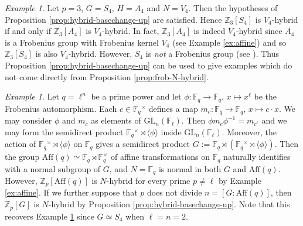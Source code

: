 \documentclass[12pt]{amsart}
\theoremstyle{plain}
\theoremstyle{remark}
\newtheorem{example}[theorem]{Example}
\theoremstyle{definition}
\numberwithin{equation}{section}
\begin{document}
\begin{example}\label{ex:S4-A4-V4}
Let $p=3$, $G=S_{4}$, $H=A_{4}$ and $N = V_{4}$. Then the hypotheses of Proposition \ref{prop:hybrid-basechange-up} are satisfied.
Hence ${\mathbb{Z}}_{3}[S_{4}]$ is $V_{4}$-hybrid if and only if ${\mathbb{Z}}_{3}[A_{4}]$ is $V_{4}$-hybrid.
In fact, ${\mathbb{Z}}_{3}[A_{4}]$ is indeed $V_{4}$-hybrid since $A_{4}$ is a Frobenius group with Frobenius kernel $V_{4}$
(see Example \ref{ex:affine}) and so ${\mathbb{Z}}_{3}[S_{4}]$ is also $V_{4}$-hybrid.
However, $S_{4}$ is \emph{not} a Frobenius group (see \cite[Example 2.18]{hybrid-ETNC}).
Thus Proposition \ref{prop:hybrid-basechange-up} can be used to give examples which do not come directly from
Proposition \ref{prop:frob-N-hybrid}.
\end{example}

\begin{example} \label{ex:affine-Frobenius}
Let $q = \ell^{n}$ be a prime power and let $\phi: {\mathbb{F}}_{q} \rightarrow {\mathbb{F}}_{q}$, $x \mapsto x^{\ell}$ be the Frobenius automorphism.
Each $c \in {\mathbb{F}}_{q}{^{\times}}$ defines a map $m_{c}: {\mathbb{F}}_{q} \rightarrow {\mathbb{F}}_{q}$, $x \mapsto c \cdot x$.
We may consider $\phi$ and $m_{c}$ as elements of ${\mathrm{GL}}_{n}({\mathbb{F}}_{\ell})$. Then $\phi m_{c} \phi^{-1} = m_{c^{\ell}}$
and we may form the semidirect product ${\mathbb{F}}_{q}{^{\times}} \rtimes \langle \phi \rangle$ inside ${\mathrm{GL}}_{n}({\mathbb{F}}_{\ell})$.
Moreover, the action of ${\mathbb{F}}_{q}{^{\times}} \rtimes \langle \phi \rangle$ on ${\mathbb{F}}_{q}$ gives a semidirect product
$G := {\mathbb{F}}_{q} \rtimes ({\mathbb{F}}_{q}{^{\times}} \rtimes \langle \phi \rangle)$.
Then the group ${\mathrm{Aff}}(q) \simeq {\mathbb{F}}_{q} \rtimes {\mathbb{F}}_{q}^{\times}$ of affine transformations on ${\mathbb{F}}_{q}$
naturally identifies with a normal subgroup of $G$, and $N = {\mathbb{F}}_{q}$ is normal in both $G$ and ${\mathrm{Aff}}(q)$.
However, ${\mathbb{Z}}_{p}[{\mathrm{Aff}}(q)]$ is $N$-hybrid for every prime $p \neq  \ell$ by Example \ref{ex:affine}.
If we further suppose that $p$ does not divide $n = [G : {\mathrm{Aff}}(q)]$, then ${\mathbb{Z}}_{p}[G]$
is $N$-hybrid by Proposition \ref{prop:hybrid-basechange-up}.
Note that this recovers Example \ref{ex:S4-A4-V4} since $G \simeq S_{4}$ when $\ell=n=2$.
\end{example}
\end{document}

